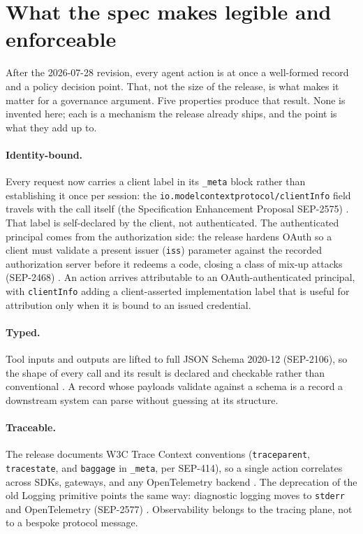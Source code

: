 \section{What the spec makes legible and enforceable}

After the 2026-07-28 revision, every agent action is at once a well-formed record
and a policy decision point. That, not the size of the release, is what makes it
matter for a governance argument. Five properties produce that result. None is
invented here; each is a mechanism the release already ships, and the point is
what they add up to.

\paragraph{Identity-bound.} Every request now carries a client label in its
\texttt{\_meta} block rather than establishing it once per session: the
\texttt{io.modelcontextprotocol/clientInfo} field travels with the call itself
(the Specification Enhancement Proposal SEP-2575) \citep{mcpchangelog}. That
label is self-declared by the client, not authenticated. The authenticated
principal comes from the authorization side: the release hardens OAuth so a
client must validate a present issuer (\texttt{iss}) parameter against the
recorded authorization server before it redeems a code, closing a class of
mix-up attacks (SEP-2468) \citep{mcpchangelog}. An action arrives attributable to
an OAuth-authenticated principal, with \texttt{clientInfo} adding a
client-asserted implementation label that is useful for attribution only when it
is bound to an issued credential.

\paragraph{Typed.} Tool inputs and outputs are lifted to full JSON Schema
2020-12 (SEP-2106), so the shape of every call and its result is declared and
checkable rather than conventional \citep{mcpchangelog}. A record whose payloads
validate against a schema is a record a downstream system can parse without
guessing at its structure.

\paragraph{Traceable.} The release documents W3C Trace Context conventions
(\texttt{traceparent}, \texttt{tracestate}, and \texttt{baggage} in
\texttt{\_meta}, per SEP-414), so a single action correlates across SDKs,
gateways, and any OpenTelemetry backend \citep{mcpchangelog}. The deprecation of
the old Logging primitive points the same way: diagnostic logging moves to
\texttt{stderr} and OpenTelemetry (SEP-2577) \citep{deprecated}. Observability
belongs to the tracing plane, not to a bespoke protocol message.

